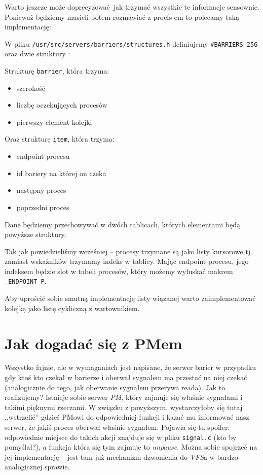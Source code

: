 Warto jeszcze może doprecyzować jak trzymać wszystkie te informacje sensownie.
Ponieważ będziemy musieli potem rozmawiać z procfs-em to polecamy taką implementację:

W pliku \texttt{/usr/src/servers/barriers/structures.h} definiujemy \texttt{\#BARRIERS 256}
oraz dwie struktury :

Strukturę \texttt{barrier}, która trzyma:
\begin{itemize}
	\item szerokość
	\item liczbę oczekujących procesów
	\item pierwszy element kolejki
\end{itemize}

Oraz strukturę \texttt{item}, która trzyma:
\begin{itemize}
	\item endpoint procesu
	\item id bariery na której on czeka
	\item następny proces
	\item poprzedni proces
\end{itemize}

Dane będziemy przechowywać w dwóch tablicach, których elementami będą powyższe struktury.

Tak jak powiedzieliśmy wcześniej -- procesy trzymane są jako listy kursorowe tj. zamiast wskaźników trzymamy indeks w tablicy. Mając endpoint procesu, jego indeksem będzie slot w tabeli procesów, który możemy wyłuskać makrem \texttt{\_ENDPOINT\_P}.

Aby uprościć sobie smutną implementację listy wiązanej warto zaimplementować kolejkę jako listę cykliczną z wartownikiem.

\section {Jak dogadać się z PMem}
Wszystko fajnie, ale w wymaganiach jest napisane, że serwer barier w przypadku gdy ktoś kto czekał w barierze i oberwał sygnałem ma przestać na niej czekać (analogicznie do tego, jak oberwanie sygnałem przerywa reada). Jak to realizujemy? Istnieje sobie serwer \textit{PM}, który zajmuje się właśnie sygnałami i takimi pięknymi rzeczami. W związku z powyższym, wystarczyłoby się tutaj ,,wstrzelić'' gdzieś PMowi do odpowiedniej funkcji i kazać mu informować nasz serwer, że jakiś proces oberwał właśnie sygnałem. Pojawia się tu spoiler: odpowiednie miejsce do takich akcji znajduje się w pliku \texttt{signal.c} (kto by pomyślał?), a funkcja która się tym zajmuje to \textit{unpause}. Można sobie spojrzeć na jej implementację -- jest tam już mechanizm dzwonienia do \textit{VFS}a w bardzo analogicznej sprawie.

